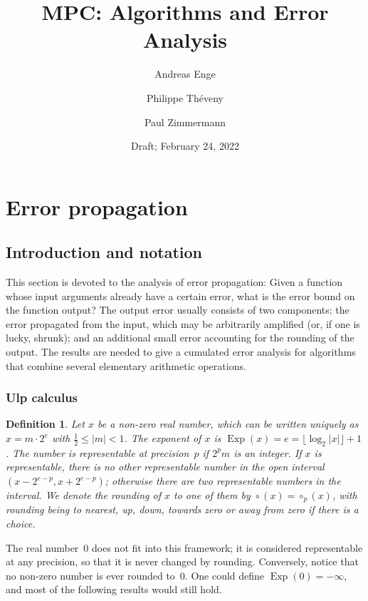 \documentclass [11pt]{article}
\title {MPC: Algorithms and Error Analysis}
\author {Andreas Enge \and Philippe Th\'eveny \and Paul Zimmermann}
\date {Draft; February 24, 2022}
\DeclareMathOperator{\Exp}{\operatorname {Exp}}
\newcommand {\round}{\operatorname {\circ}}
\newtheorem{definition}[theorem]{Definition}
\begin{document}
\maketitle
\tableofcontents


\section {Error propagation}

\subsection {Introduction and notation}

This section is devoted to the analysis of error propagation: Given a function
whose input arguments already have a certain error, what is the error bound on
the function output? The output error usually consists of two components: the
error propagated from the input, which may be arbitrarily amplified (or, if
one is lucky, shrunk); and an
additional small error accounting for the rounding of the output. The results
are needed to give a cumulated error analysis for algorithms that combine
several elementary arithmetic operations.


\subsubsection {Ulp calculus}

\begin {definition}
\label {def:exp}
Let $x$ be a non-zero real number, which can be written uniquely as
$x = m \cdot 2^e$ with $\frac{1}{2} \le |m| < 1$.
The {\em exponent} of $x$ is
$\Exp(x) = e = \lfloor \log_2 |x| \rfloor + 1$.
The number is {\em representable at precision~$p$} if
$2^p m$ is an integer.
If $x$ is representable, there is no other representable number in the
open interval $(x - 2^{e-p}, x + 2^{e-p})$; otherwise there are two
representable numbers in the interval.
We denote the rounding of $x$ to one of them by
$\round (x) = \round_p (x)$, with rounding being to nearest, up, down,
towards zero or away from zero if there is a choice.
\end {definition}

The real number~$0$ does not fit into this framework; it is considered
representable at any precision, so that it is never changed by rounding.
Conversely, notice that no non-zero number is ever rounded to~$0$.
One could define $\Exp(0) = -\infty$, and most of the following results
would still hold.
\end{document}
